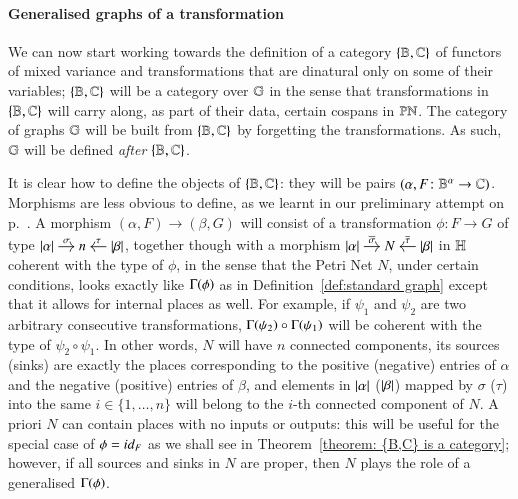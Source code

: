 \paragraph{Generalised graphs of a transformation}

We can now start working towards the definition of a category $\{ \mathbb B,\mathbb C\}$ of functors of mixed variance and transformations that are dinatural only on some of their variables; $\{ \mathbb B,\mathbb C\}$ will be a category over $\mathbb G$ in the sense that transformations in $\{ \mathbb B,\mathbb C\}$ will carry along, as part of their data, certain cospans in $\mathbb{PN}$. The category of graphs $\mathbb G$ will be built from $\{ \mathbb B,\mathbb C\}$ by forgetting the transformations. As such, $\mathbb G$ will be defined \emph{after} $\{ \mathbb B,\mathbb C\}$.

It is clear how to define the objects of $\{ \mathbb B,\mathbb C\}$: they will be pairs $(\alpha,F \colon \mathbb B^\alpha \to \mathbb C)$. Morphisms are less obvious to define, as we learnt in our preliminary attempt on p.~\pageref{first attempt}. A morphism $(\alpha,F) \to (\beta,G)$  will consist of a transformation $\phi \colon F \to G$ of type 
$
\begin{tikzcd}[cramped,sep=small]
\length\alpha \ar[r,"\sigma"] & n & \length\beta \ar[l,"\tau"']
\end{tikzcd}
$, 
together though with a morphism 
$
\begin{tikzcd}[cramped,sep=small]
\length\alpha \ar[r,"\overline\sigma "] & N & \length\beta \ar[l,"\overline\tau "']
\end{tikzcd}
$ in $\mathbb H$ coherent with the type of $\phi$, in the sense that the Petri Net $N$, under certain conditions, looks exactly like $\graph\phi$ as in Definition~\ref{def:standard graph} except that it allows for internal places as well. For example, if $\psi_1$ and $\psi_2$ are two arbitrary consecutive transformations, $\Gamma\!\left(\psi_2\right) \circ \Gamma\!\left(\psi_1\right)$ will be coherent with the type of $\psi_2\circ\psi_1$. In other words, $N$ will have $n$ connected components, its sources (sinks) are exactly the places corresponding to the positive (negative) entries of $\alpha$ and the negative (positive) entries of $\beta$, and elements in $\lvert \alpha \rvert$ ($\lvert \beta \rvert$) mapped by $\sigma$ ($\tau$) into the same $i \in \{1,\dots,n\}$ will belong to the $i$-th connected component of $N$. A priori $N$ can contain places with no inputs or outputs: this will be useful for the special case of $\phi = \id F$ as we shall see in Theorem~\ref{theorem: {B,C} is a category}; however, if all sources and sinks in $N$ are proper, then $N$ plays the role of a generalised $\graph{\phi}$.

